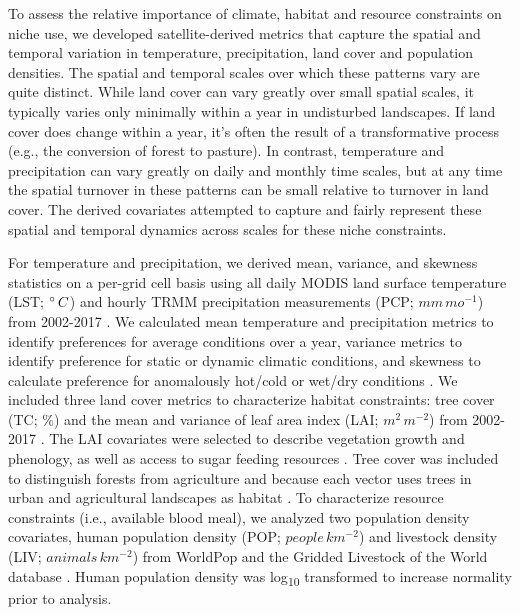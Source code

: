 To assess the relative importance of climate, habitat and resource constraints on niche use, we developed satellite-derived metrics that capture the spatial and temporal variation in temperature, precipitation, land cover and population densities. The spatial and temporal scales over which these patterns vary are quite distinct. While land cover can vary greatly over small spatial scales, it typically varies only minimally within a year in undisturbed landscapes. If land cover does change within a year, it’s often the result of a transformative process (e.g., the conversion of forest to pasture). In contrast, temperature and precipitation can vary greatly on daily and monthly time scales, but at any time the spatial turnover in these patterns can be small relative to turnover in land cover. The derived covariates attempted to capture and fairly represent these spatial and temporal dynamics across scales for these niche constraints.

For temperature and precipitation, we derived mean, variance, and skewness statistics on a per-grid cell basis using all daily MODIS land surface temperature (LST; $\degree\, C$) and hourly TRMM precipitation measurements (PCP; $mm\, mo^{-1}$) from 2002-2017 \cite{Justice1998-pu, Huffman2007-iu, Hou2013-cn}. We calculated mean temperature and precipitation metrics to identify preferences for average conditions over a year, variance metrics to identify preference for static or dynamic climatic conditions, and skewness to calculate preference for anomalously hot/cold or wet/dry conditions \cite{Huffman2007-iu, Hou2013-cn}. We included three land cover metrics to characterize habitat constraints: tree cover (TC; $\%$) and the mean and variance of leaf area index (LAI; $m^{2}\, m^{-2}$) from 2002-2017 \cite{Justice1998-pu, Hansen2013-oz}. The LAI covariates were selected to describe vegetation growth and phenology, as well as access to sugar feeding resources \cite{Martinez-Ibarra1997-ra, Chen2015-dw}. Tree cover was included to distinguish forests from agriculture and because each vector uses trees in urban and agricultural landscapes as habitat \cite{Troyo2009-yv, Landau2012-dn}. To characterize resource constraints (i.e., available blood meal), we analyzed two population density covariates, human population density (POP; $people\, km^{-2}$) and livestock density (LIV; $animals\, km^{-2}$) from WorldPop and the Gridded Livestock of the World database \cite{Tatem2017-ma, Gilbert2018-bm}. Human population density was log\textsubscript{10} transformed to increase normality prior to analysis.

